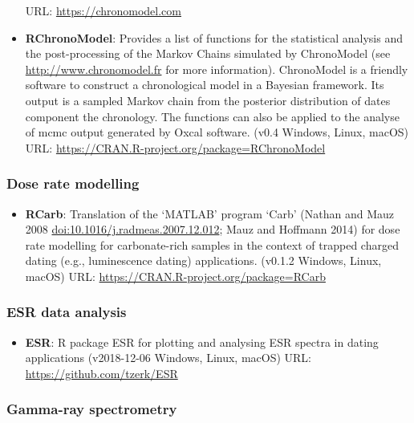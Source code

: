 \documentclass[]{article}
\providecommand{\tightlist}{%
  \setlength{\itemsep}{0pt}\setlength{\parskip}{0pt}}
\begin{document}
\begin{itemize}
  URL: \url{https://chronomodel.com}
\item
  \textbf{RChronoModel}: Provides a list of functions for the statistical analysis and the post-processing of the Markov Chains simulated by ChronoModel (see \url{http://www.chronomodel.fr} for more information). ChronoModel is a friendly software to construct a chronological model in a Bayesian framework. Its output is a sampled Markov chain from the posterior distribution of dates component the chronology. The functions can also be applied to the analyse of mcmc output generated by Oxcal software.
  (v0.4 \textbar{} Windows, Linux, macOS)
  URL: \url{https://CRAN.R-project.org/package=RChronoModel}
\end{itemize}

\hypertarget{dose-rate-modelling}{%
\subsubsection{Dose rate modelling}\label{dose-rate-modelling}}

\begin{itemize}
\tightlist
\item
  \textbf{RCarb}: Translation of the `MATLAB' program `Carb' (Nathan and Mauz 2008 \url{doi:10.1016/j.radmeas.2007.12.012}; Mauz and Hoffmann 2014) for dose rate modelling for carbonate-rich samples in the context of trapped charged dating (e.g., luminescence dating) applications.
  (v0.1.2 \textbar{} Windows, Linux, macOS)
  URL: \url{https://CRAN.R-project.org/package=RCarb}
\end{itemize}

\hypertarget{esr-data-analysis}{%
\subsubsection{ESR data analysis}\label{esr-data-analysis}}

\begin{itemize}
\tightlist
\item
  \textbf{ESR}: R package ESR for plotting and analysing ESR spectra in dating applications
  (v2018-12-06 \textbar{} Windows, Linux, macOS)
  URL: \url{https://github.com/tzerk/ESR}
\end{itemize}

\hypertarget{gamma-ray-spectrometry}{%
\subsubsection{Gamma-ray spectrometry}\label{gamma-ray-spectrometry}}
\end{document}
